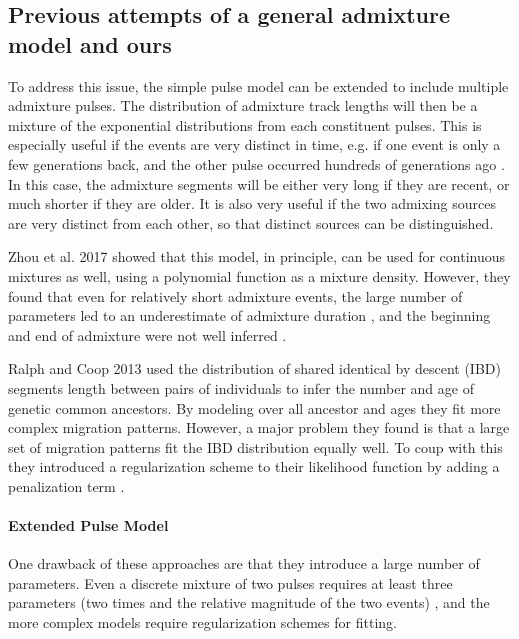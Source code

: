 \documentclass[]{article}
\let\oldparagraph\paragraph
\renewcommand{\paragraph}[1]{\oldparagraph{#1}\mbox{}}
\begin{document}
\subsection{Previous attempts of a general admixture model and ours}\label{Previous attempts of a general admixture model and ours}

To address this issue, the simple pulse model can be extended to include  multiple admixture pulses. The distribution of admixture track lengths will then be a mixture of the exponential distributions from each constituent pulses. This is especially useful if the events are very distinct in time, e.g. if one event is only a few generations back, and the other pulse occurred hundreds of generations ago \citep{fu_genome_2014,slon_genome_2018}. In this case, the admixture segments will be either very long if they are recent, or much shorter if they are older. It is also very useful if the two admixing sources are very distinct from each other, so that distinct sources can be distinguished. 

Zhou et al. 2017 \citep{zhou_modeling_2017} showed that this model, in principle, can be used for continuous mixtures as well, using a polynomial function as a mixture density. However, they found that even for relatively short admixture events, the large number of parameters led to an underestimate of admixture duration \citep{zhou_inference_2017}, and the beginning and end of admixture were not well inferred
\citep{zhou_modeling_2017,zhou_inference_2017}. 

Ralph and Coop 2013 used the distribution of shared identical by descent (IBD)  segments length between pairs of individuals to infer the number and age of genetic common ancestors. By modeling over all ancestor and ages they fit more complex migration patterns. However, a major problem they found is that a large set of migration patterns fit the IBD distribution equally well. To coup with this they introduced a regularization scheme to their likelihood function by adding a penalization term \citep{ralph_geography_2013}.

\paragraph{Extended Pulse Model}
One drawback of  these approaches are that they introduce a large number of parameters. Even a discrete mixture of two pulses requires at least three parameters (two times and the relative magnitude of the two events) \citep{pickrell_ancient_2014}, and the more complex models require regularization schemes for fitting.
\end{document}
